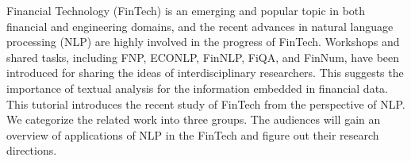 Financial Technology (FinTech) is an emerging and popular topic in both financial and engineering domains, and the recent advances in natural language processing (NLP) are highly involved in the progress of FinTech. Workshops and shared tasks, including FNP, ECONLP, FinNLP, FiQA, and FinNum, have been introduced for sharing the ideas of interdisciplinary researchers. This suggests the importance of textual analysis for the information embedded in financial data. This tutorial introduces the recent study of FinTech from the perspective of NLP. We categorize the related work into three groups. The audiences will gain an overview of applications of NLP in the FinTech and figure out their research directions.
